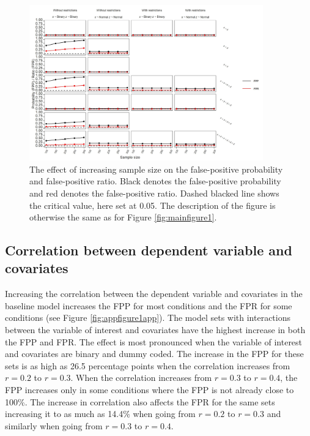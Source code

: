 \begin{figure}[hbt!]
\includegraphics[width=0.9\textwidth]{R/Analysis/Result/Figures/Figure1D.jpeg}
\centering
\caption{The effect of increasing sample size on the false-positive probability and false-positive ratio. Black denotes the false-positive probability and red denotes the false-positive ratio. Dashed blacked line shows the critical value, here set at 0.05. The description of the figure is otherwise the same as for Figure \ref{fig:mainfigure1}.}
\label{fig:mainfigure4}
\end{figure}

\subsection{Correlation between dependent variable and covariates}
Increasing the correlation between the dependent variable and  covariates in the baseline model increases the FPP for most conditions and the FPR for some conditions (see Figure \ref{fig:appfigure1app}). The model sets with interactions between the variable of interest and covariates have the highest increase in both the FPP and FPR. The effect is most pronounced when the variable of interest and covariates are binary and dummy coded. The increase in the FPP for these sets is as high as 26.5 percentage points when the correlation increases from $r=0.2$ to $r=0.3$. When the correlation increases from $r=0.3$ to $r=0.4$, the FPP increases only in some conditions where the FPP is not already close to 100\%. The increase in correlation also affects the FPR for the same sets increasing it to as much as 14.4\% when going from $r=0.2$ to $r=0.3$ and similarly when going from $r=0.3$ to $r=0.4$. 
